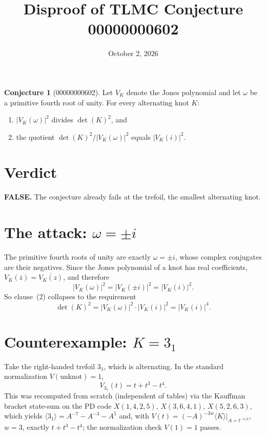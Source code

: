 \documentclass[11pt]{article}
\title{Disproof of TLMC Conjecture 00000000602}
\author{}
\date{October 2, 2026}
\theoremstyle{definition}
\newtheorem{conjec}{Conjecture}
\begin{document}
\maketitle

\begin{conjec}[00000000602]
Let $V_K$ denote the Jones polynomial and let $\omega$ be a primitive
fourth root of unity.  For every alternating knot $K$:
\begin{enumerate}
  \item $|V_K(\omega)|^2$ divides $\det(K)^2$, and
  \item the quotient $\det(K)^2 / |V_K(\omega)|^2$ equals $|V_K(i)|^2$.
\end{enumerate}
\end{conjec}

\section*{Verdict}

\textbf{FALSE.}  The conjecture already fails at the trefoil, the smallest
alternating knot.

\section*{The attack: $\omega = \pm i$}

The primitive fourth roots of unity are exactly $\omega = \pm i$, whose
complex conjugates are their negatives.  Since the Jones polynomial of a
knot has real coefficients, $V_K(\overline{z}) = \overline{V_K(z)}$, and
therefore
\[
  |V_K(\omega)|^2 = |V_K(\pm i)|^2 = |V_K(i)|^2 .
\]
So clause~(2) collapses to the requirement
\begin{equation}\label{eq:collapse}
  \det(K)^2 = |V_K(\omega)|^2 \cdot |V_K(i)|^2 = |V_K(i)|^4 .
\end{equation}

\section*{Counterexample: $K = 3_1$}

Take the right-handed trefoil $3_1$, which is alternating.  In the standard
normalization $V(\text{unknot}) = 1$,
\[
  V_{3_1}(t) = t + t^3 - t^4 .
\]
This was recomputed from scratch (independent of tables) via the Kauffman
bracket state-sum on the PD code $X(1,4,2,5),\,X(3,6,4,1),\,X(5,2,6,3)$,
which yields $\langle 3_1\rangle = A^{-7} - A^{-3} - A^5$ and, with
$V(t) = (-A)^{-3w}\langle K\rangle|_{A = t^{-1/4}}$, $w = 3$, exactly
$t + t^3 - t^4$; the normalization check $V(1) = 1$ passes.
\end{document}
